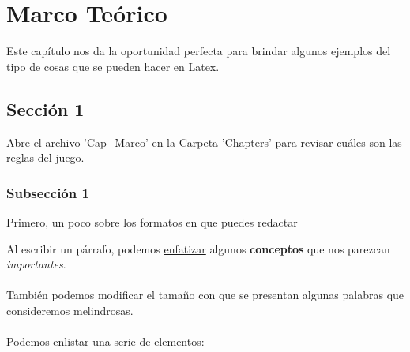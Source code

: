 \chapter{Marco Teórico} %

\label{Cap_Marco} %


\newcommand{\keyword}[1]{\textbf{#1}}
\newcommand{\tabhead}[1]{\textbf{#1}}
\newcommand{\code}[1]{\texttt{#1}}
\newcommand{\file}[1]{\texttt{\bfseries#1}}
\newcommand{\option}[1]{\texttt{\itshape#1}}


Este capítulo nos da la oportunidad perfecta para brindar algunos ejemplos del tipo de cosas que se pueden hacer en Latex.\\

\section{Sección 1}  %

Abre el archivo 'Cap_Marco' en la Carpeta 'Chapters' para revisar cuáles son las reglas del juego.\\

\subsection{Subsección 1}

\begin{center}  %
Primero, un poco sobre los formatos en que puedes redactar\\
\end{center}

Al escribir un párrafo, podemos \underline{enfatizar} algunos \textbf{conceptos} que nos parezcan \textit{importantes}.\\
\\
También podemos modificar el \Huge{tamaño} \huge{con} \LARGE{que} \Large{se} \large{presentan} algunas \small{palabras} \footnotesize{que} \scriptsize{consideremos}  \tiny{melindrosas}.\\
\\
\normalsize Podemos enlistar una serie de elementos:\\

